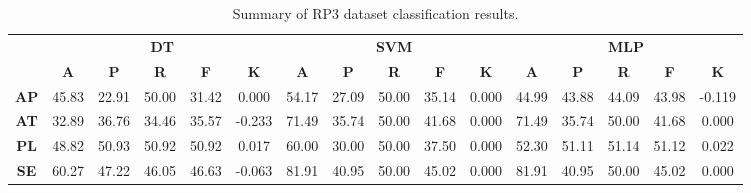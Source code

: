 \begin{landscape}
\begin{table}[htbp]
\footnotesize
\centering
\caption{Summary of RP3 dataset classification results.}
\label{tab:base_female}
\begin{tabular}{|c|c|c|c|c|c|c|c|c|c|c|c|c|c|c|c|}
\hline
\multirow{2}{*}{}	& \multicolumn{5}{c|}{\textbf{DT}}												& \multicolumn{5}{c|}{\textbf{SVM}}												& \multicolumn{5}{c|}{\textbf{MLP}}												\\ \cline{2-16} 
					& \textbf{A}	& \textbf{P}	& \textbf{R}	& \textbf{F}	& \textbf{K}	& \textbf{A}	& \textbf{P}	& \textbf{R}	& \textbf{F}	& \textbf{K}	& \textbf{A}	& \textbf{P}	& \textbf{R}	& \textbf{F}	& \textbf{K}	\\ \hline
\textbf{AP}			& 45.83			& 22.91			& 50.00			& 31.42			& 0.000			& 54.17			& 27.09			& 50.00			& 35.14			& 0.000			& 44.99			& 43.88			& 44.09			& 43.98			& -0.119			\\ \hline
\textbf{AT}			& 32.89			& 36.76			& 34.46			& 35.57			& -0.233			& 71.49			& 35.74			& 50.00			& 41.68			& 0.000			& 71.49			& 35.74			& 50.00			& 41.68			& 0.000			\\ \hline
\textbf{PL}			& 48.82			& 50.93			& 50.92			& 50.92			& 0.017			& 60.00			& 30.00			& 50.00			& 37.50			& 0.000			& 52.30			& 51.11			& 51.14			& 51.12			& 0.022			\\ \hline
\textbf{SE}			& 60.27			& 47.22			& 46.05			& 46.63			& -0.063			& 81.91			& 40.95			& 50.00			& 45.02			& 0.000			& 81.91			& 40.95			& 50.00			& 45.02			& 0.000			\\ \hline
\end{tabular}
\end{table}
\end{landscape}